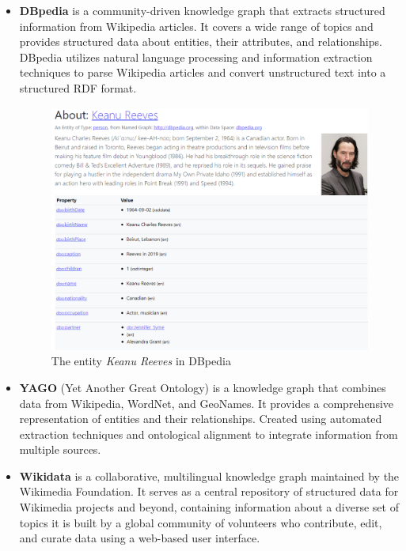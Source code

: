 \begin{itemize}
    \item \textbf{DBpedia} is a community-driven knowledge graph that extracts structured information from Wikipedia articles. It covers a wide range of topics and provides structured data about entities, their attributes, and relationships. DBpedia utilizes natural language processing and information extraction techniques to parse Wikipedia articles and convert unstructured text into a structured RDF format.
    
    \begin{figure}[!h]
        \centering
        \includegraphics[width=\textwidth]{fig/kgs/Keanu_DBpedia.png}
        \caption{The entity \textit{Keanu Reeves} in DBpedia}
        \label{fig:kgs-dbpedia}
    \end{figure}
    
    \item \textbf{YAGO} (Yet Another Great Ontology) is a knowledge graph that combines data from Wikipedia, WordNet, and GeoNames. It provides a comprehensive representation of entities and their relationships. Created using automated extraction techniques and ontological alignment to integrate information from multiple sources.
    
    \item \textbf{Wikidata} is a collaborative, multilingual knowledge graph maintained by the Wikimedia Foundation. It serves as a central repository of structured data for Wikimedia projects and beyond, containing information about a diverse set of topics it is built by a global community of volunteers who contribute, edit, and curate data using a web-based user interface.
    

\end{itemize}
